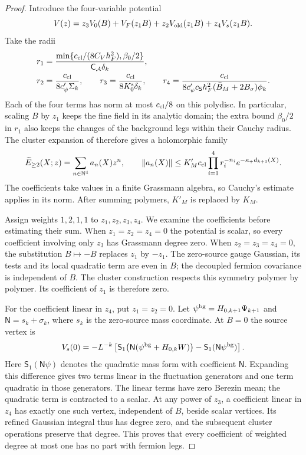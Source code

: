 \documentclass[11pt,letterpaper,reqno]{amsart}
\theoremstyle{definition}
\theoremstyle{remark}
\begin{document}
\begin{proof}
Introduce the four-variable potential
\[
 V(z)=z_3V_0(B)+V_F(z_1B)
          +z_2V_{\rm old}(z_1B)+z_4V_s(z_1B).
\]
Take the radii
\[
 \begin{split}
 r_1&=\frac{\min\{c_{\rm cl}/(8C_Vh_F^2),\beta_0/2\}}
                 {\mathsf C_{\mathcal A}\delta_k},\\
 r_2&=\frac{c_{\rm cl}}{8c'_\psi\Sigma_k},\qquad
 r_3=\frac{c_{\rm cl}}{8K_0^{\rm s}\delta_k},\qquad
 r_4=\frac{c_{\rm cl}}
 {8c'_\psi c_{\mathsf S}h_F^2(\bar B_M+2B_\sigma)\phi_k}.
 \end{split}
\]
Each of the four terms has norm at most $c_{\rm cl}/8$
on this polydisc.  In particular, scaling $B$ by $z_1$
keeps the fine field in its analytic domain; the extra
bound $\beta_0/2$ in $r_1$ also keeps the changes of the
background legs within their Cauchy radius.  The cluster
expansion of \cite[Lem. 7.5]{QCDM1} therefore gives a
holomorphic family
\[
 \widetilde E_{\ge2}(X;z)=\sum_{n\in\mathbb N^4}a_n(X)z^n,
 \qquad
 \|a_n(X)\|\le K'_Mc_{\rm cl}
              \prod_{i=1}^4r_i^{-n_i}e^{-\kappa_+d_{k+1}(X)}.
\]
The coefficients take values in a finite Grassmann algebra,
so Cauchy's estimate applies in its norm.  After summing
polymers, $K'_M$ is replaced by $K_M$.

Assign weights $1,2,1,1$ to $z_1,z_2,z_3,z_4$.
We examine the coefficients before estimating their sum.
When $z_1=z_2=z_4=0$ the potential is scalar, so every
coefficient involving only $z_3$ has Grassmann degree zero.
When $z_2=z_3=z_4=0$, the substitution $B\mapsto-B$
replaces $z_1$ by $-z_1$.  The zero-source gauge Gaussian,
its tests and its local quadratic term are even in $B$;
the decoupled fermion covariance is independent of $B$.
The cluster construction respects this symmetry polymer
by polymer.  Its coefficient of $z_1$ is therefore zero.

For the coefficient linear in $z_4$, put $z_1=z_2=0$.
Let $\psi^{\rm bg}=H_{0,k+1}\Psi_{k+1}$ and
$\mathsf N=s_k+\sigma_k$, where $s_k$ is the zero-source
mass coordinate.  At $B=0$ the source vertex is
\[
 V_s(0)=-L^{-k}\left[
  \mathsf S_1\bigl(\mathsf N(\psi^{\rm bg}+H_{0,k}W)\bigr)
                -\mathsf S_1(\mathsf N\psi^{\rm bg})\right].
\]
Here $\mathsf S_1(\mathsf N\psi)$ denotes the quadratic
mass form with coefficient $\mathsf N$.  Expanding this
difference gives two terms linear in the fluctuation
generators and one term quadratic in those generators.
The linear terms have zero Berezin mean; the quadratic
term is contracted to a scalar.  At any power of $z_3$,
a coefficient linear in $z_4$ has exactly one such
vertex, independent of $B$, beside scalar vertices.
Its refined Gaussian integral thus has degree zero,
and the subsequent cluster operations preserve that
degree.  This proves that every coefficient of weighted
degree at most one has no part with fermion legs.


\end{proof}
\end{document}
